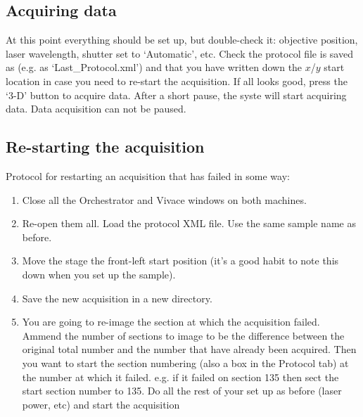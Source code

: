 \documentclass[paper=a4, fontsize=11pt]{scrartcl} %
\numberwithin{equation}{section} %
\numberwithin{figure}{section} %
\numberwithin{table}{section} %
\begin{document}
\subsection{Acquiring data}
\label{acqData}
At this point everything should be set up, but double-check it: objective position, laser wavelength, shutter set to `Automatic', etc.
Check the protocol file is saved as (e.g. as `Last\_Protocol.xml') and that you have written down the $x$/$y$ start location in case you need to re-start the acquisition.
If all looks good, press the `3-D' button to acquire data. 
After a short pause, the syste will start acquiring data.
Data acquisition can not be paused. 


\subsection{Re-starting the acquisition}
Protocol for restarting an acquisition that has failed in some way:
\begin{enumerate}
\item Close all the Orchestrator and Vivace windows on both machines. 
\item Re-open them all. Load the protocol XML file. Use the same sample name as before.
\item Move the stage the front-left start position (it's a good habit to note this down when you set up the sample).
\item Save the new acquisition in a new directory. 
\item You are going to re-image the section at which the acquisition failed.
Ammend the number of sections to image to be the difference between the original total number and the number that have already been acquired. 
Then you want to start the section numbering (also a box in the Protocol tab) at the number at which it failed. 
e.g. if it failed on section 135 then sect the start section number to 135. 
Do all the rest of your set up as before (laser power, etc) and start the acquisition
\end{enumerate}
\end{document}
